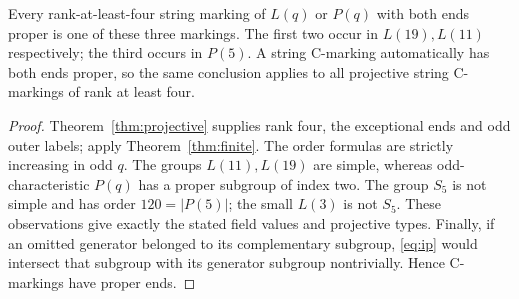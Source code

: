 \begin{corollary}\label{cor:projective}
Every rank-at-least-four string marking of $L(q)$ or $P(q)$ with both
ends proper is one of these three markings. The first two occur in
$L(19),L(11)$ respectively; the third occurs in $P(5)$.
A string C-marking automatically has both ends proper, so the same
conclusion applies to all projective string C-markings of rank at least four.
\end{corollary}
\begin{proof}
Theorem~\ref{thm:projective} supplies rank four, the exceptional ends and
odd outer labels; apply Theorem~\ref{thm:finite}. The order formulas are
strictly increasing in odd $q$. The groups $L(11),L(19)$ are simple,
whereas odd-characteristic $P(q)$ has a proper subgroup of index two.
The group $S_5$ is not simple and has order $120=|P(5)|$; the small
$L(3)$ is not $S_5$. These observations give exactly the stated field
values and projective types. Finally, if an omitted generator belonged
to its complementary subgroup, \eqref{eq:ip} would intersect that subgroup
with its generator subgroup nontrivially. Hence C-markings have proper ends.
\end{proof}

